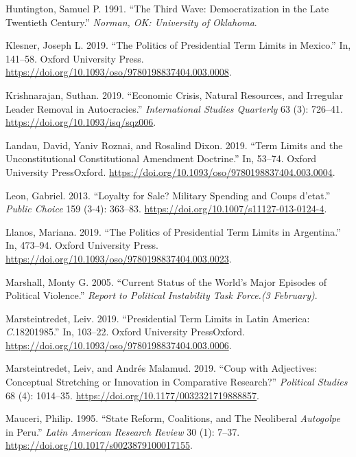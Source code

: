 \documentclass[
  12pt,
]{report}
\newlength{\cslhangindent}
\newenvironment{CSLReferences}[2] %
 {\begin{list}{}{%
  \setlength{\itemindent}{0pt}
  \setlength{\leftmargin}{0pt}
  \setlength{\parsep}{0pt}
  \ifodd #1
   \setlength{\leftmargin}{\cslhangindent}
   \setlength{\itemindent}{-1\cslhangindent}
  \fi
  \setlength{\itemsep}{#2\baselineskip}}}
 {\end{list}}
\begin{document}
\begin{CSLReferences}{1}{0}
Huntington, Samuel P. 1991. {``The Third Wave: Democratization in the
Late Twentieth Century.''} \emph{Norman, OK: University of Oklahoma}.

Klesner, Joseph L. 2019. {``The Politics of Presidential Term Limits in
Mexico.''} In, 141--58. Oxford University Press.
\url{https://doi.org/10.1093/oso/9780198837404.003.0008}.

Krishnarajan, Suthan. 2019. {``Economic Crisis, Natural Resources, and
Irregular Leader Removal in Autocracies.''} \emph{International Studies
Quarterly} 63 (3): 726--41. \url{https://doi.org/10.1093/isq/sqz006}.

Landau, David, Yaniv Roznai, and Rosalind Dixon. 2019. {``Term Limits
and the Unconstitutional Constitutional Amendment Doctrine.''} In,
53--74. Oxford University PressOxford.
\url{https://doi.org/10.1093/oso/9780198837404.003.0004}.

Leon, Gabriel. 2013. {``Loyalty for Sale? Military Spending and Coups
d{'}etat.''} \emph{Public Choice} 159 (3-4): 363--83.
\url{https://doi.org/10.1007/s11127-013-0124-4}.

Llanos, Mariana. 2019. {``The Politics of Presidential Term Limits in
Argentina.''} In, 473--94. Oxford University Press.
\url{https://doi.org/10.1093/oso/9780198837404.003.0023}.

Marshall, Monty G. 2005. {``Current Status of the World's Major Episodes
of Political Violence.''} \emph{Report to Political Instability Task
Force.(3 February)}.

Marsteintredet, Leiv. 2019. {``Presidential Term Limits in Latin
America: {\emph{C}}.1820{\textendash}1985.''} In, 103--22. Oxford
University PressOxford.
\url{https://doi.org/10.1093/oso/9780198837404.003.0006}.

Marsteintredet, Leiv, and Andrés Malamud. 2019. {``Coup with Adjectives:
Conceptual Stretching or Innovation in Comparative Research?''}
\emph{Political Studies} 68 (4): 1014--35.
\url{https://doi.org/10.1177/0032321719888857}.

Mauceri, Philip. 1995. {``State Reform, Coalitions, and The Neoliberal
{\emph{Autogolpe}} in Peru.''} \emph{Latin American Research Review} 30
(1): 7--37. \url{https://doi.org/10.1017/s0023879100017155}.


\end{CSLReferences}
\end{document}
